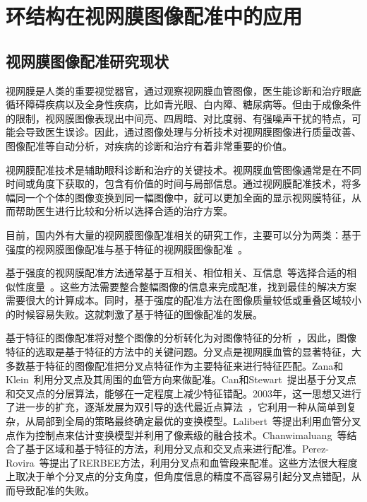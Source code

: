

\chapter{环结构在视网膜图像配准中的应用}

\renewcommand\arraystretch{1}

\section{视网膜图像配准研究现状}
\label{cha:retinal}

视网膜是人类的重要视觉器官，通过观察视网膜血管图像，医生能诊断和治疗眼底循环障碍疾病以及全身性疾病，比如青光眼、白内障、糖尿病等。但由于成像条件的限制，视网膜图像表现出中间亮、四周暗、对比度弱、有强噪声干扰的特点，可能会导致医生误诊。因此，通过图像处理与分析技术对视网膜图像进行质量改善、图像配准等自动分析，对疾病的诊断和治疗有着非常重要的价值。

视网膜配准技术是辅助眼科诊断和治疗的关键技术。视网膜血管图像通常是在不同时间或角度下获取的，包含有价值的时间与局部信息。通过视网膜配准技术，将多幅同一个个体的图像变换到同一幅图像中，就可以更加全面的显示视网膜特征，从而帮助医生进行比较和分析以选择合适的治疗方案。

目前，国内外有大量的视网膜图像配准相关的研究工作，主要可以分为两类：基于强度的视网膜图像配准与基于特征的视网膜图像配准~\cite{oliveira2014medical}。

基于强度的视网膜配准方法通常基于互相关、相位相关、互信息~\cite{penney1998comparison}等选择合适的相似性度量~\cite{Glocker02,Nunes03,Dreo04}。这些方法需要整合整幅图像的信息来完成配准，找到最佳的解决方案需要很大的计算成本。同时，基于强度的配准方法在图像质量较低或重叠区域较小的时候容易失败。这就刺激了基于特征的图像配准的发展。

基于特征的图像配准将对整个图像的分析转化为对图像特征的分析~\cite{dingnan}，因此，图像特征的选取是基于特征的方法中的关键问题。分叉点是视网膜血管的显著特征，大多数基于特征的图像配准把分叉点特征作为主要特征来进行特征匹配。Zana和Klein~\cite{zana1999multimodal}利用分叉点及其周围的血管方向来做配准。Can和Stewart~\cite{can2002feature}提出基于分叉点和交叉点的分层算法，能够在一定程度上减少特征错配。2003年，这一思想又进行了进一步的扩充，逐渐发展为双引导的迭代最近点算法~\cite{stewart2003dual}，它利用一种从简单到复杂，从局部到全局的策略最终确定最优的变换模型。Lalibert~\cite{laliberte2003registration}等提出利用血管分叉点作为控制点来估计变换模型并利用了像素级的融合技术。Chanwimaluang~\cite{chanwimaluang2006hybrid}等结合了基于区域和基于特征的方法，利用分叉点和交叉点来进行配准。Perez-Rovira~\cite{perez2012rerbee}等提出了RERBEE方法，利用分叉点和血管段来配准。这些方法很大程度上取决于单个分叉点的分支角度，但角度信息的精度不高容易引起分叉点错配，从而导致配准的失败。

